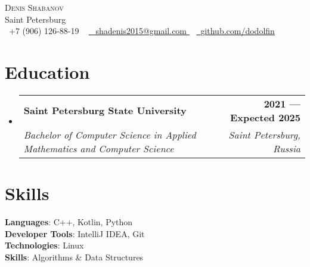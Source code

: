 \documentclass[a4,12pt]{article}
\makeatletter
\newcommand{\resumeSubheading}[4]{
  \vspace{-2pt}\item
    \begin{tabular*}{1.0\textwidth}[t]{l@{\extracolsep{\fill}}r}
      \textbf{#1} & \textbf{\small #2} \\
      \textit{\small#3} & \textit{\small #4} \\
    \end{tabular*}\vspace{-7pt}
}
\newcommand{\resumeSubHeadingListStart}{\begin{itemize}[leftmargin=0.0in, label={}]}
\newcommand{\resumeSubHeadingListEnd}{\end{itemize}}
\makeatother
\begin{document}

\begin{center}
    {\Huge \scshape Denis Shabanov} \\ \vspace{1pt}
    Saint Petersburg \\ \vspace{1pt}
    \small \raisebox{-0.1\height}\faPhone\ 
    +7 (906) 126-88-19 ~
    \href{
    mailto:shadenis2015@gmail.com
    }{\raisebox{-0.2\height}\faEnvelope\  \underline{
    shadenis2015@gmail.com
    }} ~ 
    \href{https://github.com/dodolfin}{\raisebox{-0.2\height}\faGithub\ \underline{github.com/dodolfin}}
    \vspace{-8pt}
\end{center}


\section{Education}
  \resumeSubHeadingListStart
    \resumeSubheading
      {Saint Petersburg State University}{2021 — Expected 2025}
      {Bachelor of Computer Science in Applied Mathematics and Computer Science}{Saint Petersburg, Russia}
  \resumeSubHeadingListEnd
  
\section{Skills}
 \begin{itemize}[leftmargin=0.15in, label={}]
    \small{\item{
     \textbf{Languages}{: C++, Kotlin, Python} \\
     \textbf{Developer Tools}{: IntelliJ IDEA, Git} \\
     \textbf{Technologies}{: Linux} \\
     \textbf{Skills}{: Algorithms \& Data Structures}
    }}
 \end{itemize}
 \vspace{-16pt}
\end{document}
